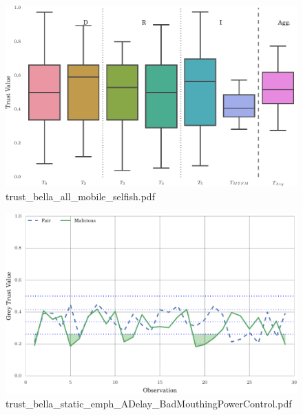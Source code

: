 \documentclass{article}
\begin{document}
\begin{figure}[h!]
\centering
\includegraphics[width=\linewidth]{trust_bella_all_mobile_selfish.pdf}
\caption{trust\_bella\_all\_mobile\_selfish.pdf}
\end{figure}




\begin{figure}[h!]
\centering
\includegraphics[width=\linewidth]{trust_bella_static_emph_ADelay_BadMouthingPowerControl.pdf}
\caption{trust\_bella\_static\_emph\_ADelay\_BadMouthingPowerControl.pdf}
\end{figure}
\end{document}
